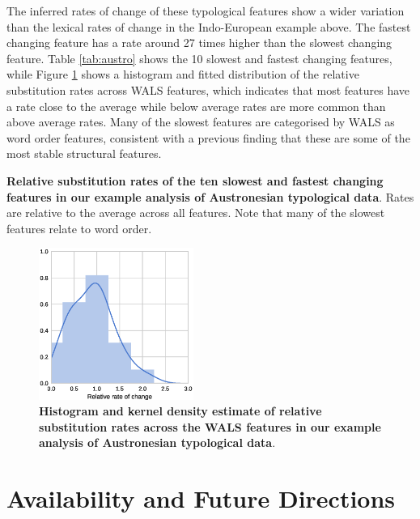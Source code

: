 \documentclass[10pt,a4paper]{article}
\begin{document}
The inferred rates of change of these typological features show a wider variation than the lexical rates of change in the Indo-European example above.  The fastest changing feature has a rate around 27 times higher than the slowest changing feature.  Table \ref{tab:austro} shows the 10 slowest and fastest changing features, while Figure \ref{fig:austro} shows a histogram and fitted distribution of the relative substitution rates across WALS features, which indicates that most features have a rate close to the average while below average rates are more common than above average rates.  Many of the slowest features are categorised by WALS as word order features, consistent with a previous finding that these are some of the most stable structural features\cite{Dediu2013}.

\begin{table}[ht]
	\begin{center}
		
	\end{center}
	\caption{\textbf{Relative substitution rates of the ten slowest and fastest changing features in our example analysis of Austronesian typological data}.  Rates are relative to the average across all features.  Note that many of the slowest features relate to word order.}
\label{tab:austro}
\end{table}

\begin{figure}[t]
	\begin{center}
	\includegraphics[width=0.45\textwidth]{examples/austronesian/rate_variation.eps}
	\end{center}
	\caption{\textbf{Histogram and kernel density estimate of relative substitution rates across the WALS features in our example analysis of Austronesian typological data}.}
\label{fig:austro}
\end{figure}

\section{Availability and Future Directions}
\end{document}
